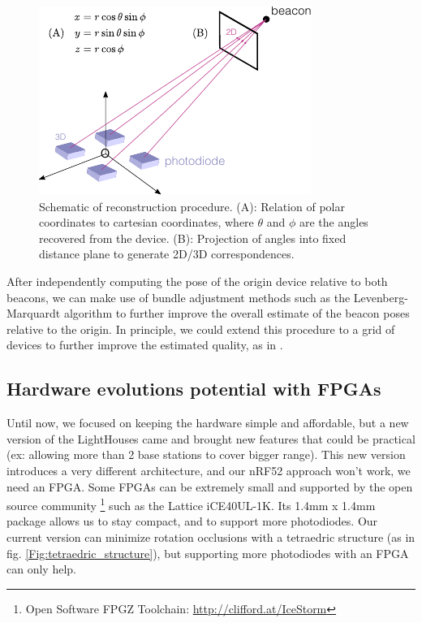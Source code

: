\documentclass[sigchi]{acmart}
\begin{document}
\begin{figure}[h]
\centering
\includegraphics[width=1.0\columnwidth]{Figures/reconstruction.pdf}
\caption{Schematic of reconstruction procedure. (A): Relation of polar coordinates to cartesian coordinates, where $\theta$ and $\phi$ are the angles recovered from the device. (B): Projection of angles into fixed distance plane to generate 2D/3D correspondences.}
\label{Fig:Reconstruction}
\end{figure}

After independently computing the pose of the origin device relative to both beacons, we can make use of bundle adjustment methods such as the Levenberg-Marquardt algorithm \cite{Marquardt1963} to further improve the overall estimate of the beacon poses relative to the origin. In principle, we could extend this procedure to a grid of devices to further improve the estimated quality, as in \cite{Garrido-Jurado2014}.


\subsection{Hardware evolutions potential with FPGAs}

Until now, we focused on keeping the hardware simple and affordable, but a new version of the LightHouses came and
brought new features that could be practical (ex: allowing more than 2 base stations to cover bigger range).
This new version introduces a very different architecture, and our nRF52 approach won't work, we need an FPGA.
Some FPGAs can be extremely small and supported by the open source community \footnote{ Open Software FPGZ Toolchain: \url{http://clifford.at/IceStorm} } such as the Lattice iCE40UL-1K. Its 1.4mm x 1.4mm package allows us to stay 
compact, and to support more photodiodes.
Our current version can minimize rotation occlusions with a tetraedric structure (as in fig. \ref{Fig:tetraedric_structure}), but supporting more photodiodes with an FPGA can only help.
\end{document}

